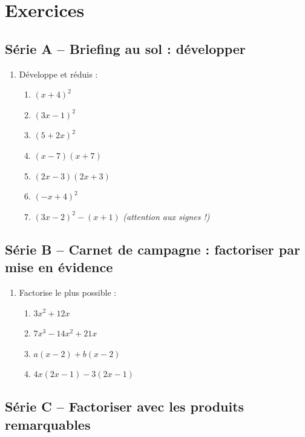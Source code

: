 \documentclass[../main.tex]{subfiles}
\begin{document}
\section{Exercices}

\subsection{Série A -- Briefing au sol : développer}

\begin{enumerate}[label=\textbf{\arabic*.}]

\item Développe et réduis :
\begin{enumerate}[label=\alph*)]
  \item $(x + 4)^2$ \qquad
  \item $(3x - 1)^2$ \qquad
  \item $(5 + 2x)^2$ \qquad
  \item $(x - 7)(x + 7)$
  \item $(2x - 3)(2x + 3)$ \qquad
  \item $(-x + 4)^2$ \qquad
  \item $(3x - 2)^2 - (x+1)$ \quad\textit{(attention aux signes !)}
\end{enumerate}

\end{enumerate}

\subsection{Série B -- Carnet de campagne : factoriser par mise en évidence}

\begin{enumerate}[label=\textbf{\arabic*.},start=2]

\item Factorise le plus possible :
\begin{enumerate}[label=\alph*)]
  \item $3x^2 + 12x$ \qquad
  \item $7x^3 - 14x^2 + 21x$ \qquad
  \item $a(x - 2) + b(x - 2)$ \qquad
  \item $4x(2x - 1) - 3(2x - 1)$
\end{enumerate}

\end{enumerate}

\subsection{Série C -- Factoriser avec les produits remarquables}
\end{document}
